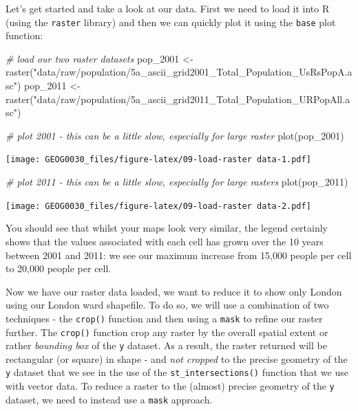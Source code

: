 \documentclass[
]{book}
\newenvironment{Shaded}{\begin{snugshade}}{\end{snugshade}}
\newcommand{\CommentTok}[1]{\textcolor[rgb]{0.56,0.35,0.01}{\textit{#1}}}
\newcommand{\FunctionTok}[1]{\textcolor[rgb]{0.00,0.00,0.00}{#1}}
\newcommand{\NormalTok}[1]{#1}
\newcommand{\OtherTok}[1]{\textcolor[rgb]{0.56,0.35,0.01}{#1}}
\newcommand{\StringTok}[1]{\textcolor[rgb]{0.31,0.60,0.02}{#1}}
\begin{document}
Let's get started and take a look at our data. First we need to load it into R (using the \texttt{raster} library) and then we can quickly plot it using the \texttt{base} plot function:

\begin{Shaded}
\begin{Highlighting}[]
\CommentTok{\# load our two raster datasets}
\NormalTok{pop\_2001 }\OtherTok{\textless{}{-}} \FunctionTok{raster}\NormalTok{(}\StringTok{"data/raw/population/5a\_ascii\_grid2001\_Total\_Population\_UsRsPopA.asc"}\NormalTok{)}
\NormalTok{pop\_2011 }\OtherTok{\textless{}{-}} \FunctionTok{raster}\NormalTok{(}\StringTok{"data/raw/population/5a\_ascii\_grid2011\_Total\_Population\_URPopAll.asc"}\NormalTok{)}

\CommentTok{\# plot 2001 {-} this can be a little slow, especially for large raster}
\FunctionTok{plot}\NormalTok{(pop\_2001)}
\end{Highlighting}
\end{Shaded}

\texttt{[image: GEOG0030\_files/figure-latex/09-load-raster data-1.pdf]}

\begin{Shaded}
\begin{Highlighting}[]
\CommentTok{\# plot 2011 {-} this can be a little slow, especially for large rasters}
\FunctionTok{plot}\NormalTok{(pop\_2011)}
\end{Highlighting}
\end{Shaded}

\texttt{[image: GEOG0030\_files/figure-latex/09-load-raster data-2.pdf]}

You should see that whilst your maps look very similar, the legend certainly shows that the values associated with each cell has grown over the 10 years between 2001 and 2011: we see our maximum increase from 15,000 people per cell to 20,000 people per cell.

Now we have our raster data loaded, we want to reduce it to show only London using our London ward shapefile. To do so, we will use a combination of two techniques - the \texttt{crop()} function and then using a \texttt{mask} to refine our raster further. The \texttt{crop()} function crop any raster by the overall spatial extent or rather \emph{bounding box} of the \texttt{y} dataset. As a result, the raster returned will be rectangular (or square) in shape - and \emph{not cropped} to the precise geometry of the \texttt{y} dataset that we see in the use of the \texttt{st\_intersections()} function that we use with vector data. To reduce a raster to the (almost) precise geometry of the \texttt{y} dataset, we need to instead use a \texttt{mask} approach.
\end{document}
